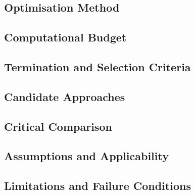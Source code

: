 
\subsection{Optimisation Method}
\label{sec:res-opt-obj-optimisation-method}


\subsection{Computational Budget}
\label{sec:res-opt-obj-computational-budget}


\subsection{Termination and Selection Criteria}
\label{sec:res-opt-obj-termination-selection-criteria}


\subsection{Candidate Approaches}
\label{sec:res-opt-obj-candidate-approaches}


\subsection{Critical Comparison}
\label{sec:res-opt-obj-critical-comparison}


\subsection{Assumptions and Applicability}
\label{sec:res-opt-obj-assumptions}


\subsection{Limitations and Failure Conditions}
\label{sec:res-opt-obj-limitations}

